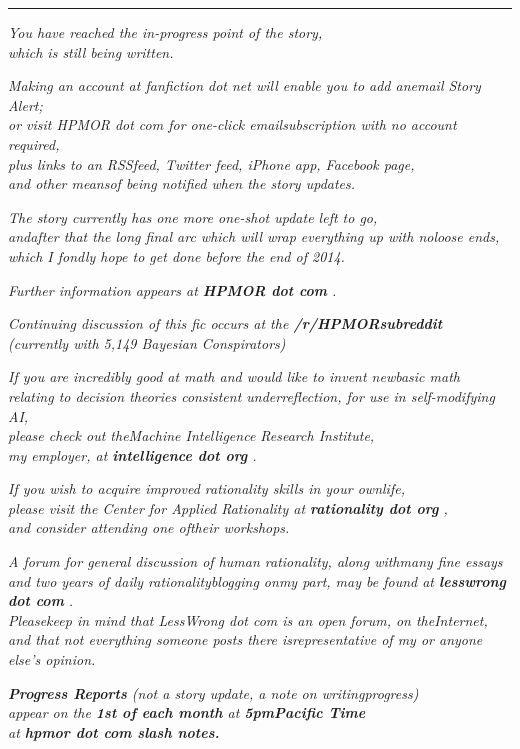 \begin{center}\rule{3in}{0.4pt}\end{center}

\emph{You have reached the in-progress point of the story,}\\
\emph{which is still being written.}

\emph{Making an account at fanfiction dot net will enable you to add anemail Story Alert;}\\ \emph{or visit HPMOR dot com for one-click emailsubscription with no account required,}\\ \emph{plus links to an RSSfeed, Twitter feed, iPhone app, Facebook page,}\\ \emph{and other meansof being notified when the story updates.}

\emph{The story currently has one more one-shot update left to go,\\ andafter that the long final arc which will wrap everything up with noloose ends,\\ which I fondly hope to get done before the end of 2014.}

\emph{Further information appears at \textbf{HPMOR dot com} .}

\emph{Continuing discussion of this fic occurs at the \textbf{/r/HPMORsubreddit}}\\ \emph{(currently with 5,149 Bayesian Conspirators)}

\emph{If you are incredibly good at math and would like to invent newbasic math}\\ \emph{relating to decision theories consistent underreflection, for use in self-modifying AI,}\\ \emph{please check out theMachine Intelligence Research Institute,}\\ \emph{my employer, at
\textbf{intelligence dot org} .}

\emph{If you wish to acquire improved rationality skills in your ownlife,}\\ \emph{please visit the Center for Applied Rationality at
\textbf{rationality dot org} ,}\\ \emph{and consider attending one oftheir workshops.}

\emph{A forum for general discussion of human rationality, along withmany fine essays}\\ \emph{and two years of daily rationalityblogging onmy part, may be found at \textbf{lesswrong dot com} .}\\ \emph{Pleasekeep in mind that LessWrong dot com is an open forum, on theInternet,}\\ \emph{and that not everything someone posts there isrepresentative of my or anyone else's opinion.}

\emph{\textbf{Progress Reports} (not a story update, a note on writingprogress)\\ appear on the \textbf{1st of each month} at \textbf{5pmPacific Time\\} at \textbf{hpmor dot com slash notes.}}